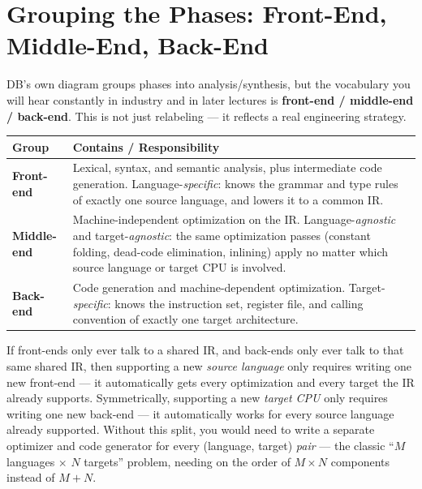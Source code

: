 \documentclass[full-course-notes.tex]{subfiles}
\begin{document}
\section{Grouping the Phases: Front-End, Middle-End, Back-End}
\label{sec:l2-grouping-phases}

\beyonddb DB's own diagram groups phases into analysis/synthesis, but the vocabulary you will
hear constantly in industry and in later lectures is \textbf{front-end / middle-end / back-end}.
This is not just relabeling --- it reflects a real engineering strategy.

\begin{center}
\renewcommand{\arraystretch}{1.3}
\begin{tabularx}{\textwidth}{@{}l X@{}}
\toprule
\textbf{Group} & \textbf{Contains / Responsibility} \\
\midrule
\textbf{Front-end} & Lexical, syntax, and semantic analysis, plus intermediate code
generation. Language-\emph{specific}: knows the grammar and type rules of exactly one source
language, and lowers it to a common IR. \\
\textbf{Middle-end} & Machine-independent optimization on the IR. Language-\emph{agnostic} and
target-\emph{agnostic}: the same optimization passes (constant folding, dead-code elimination,
inlining) apply no matter which source language or target CPU is involved. \\
\textbf{Back-end} & Code generation and machine-dependent optimization. Target-\emph{specific}:
knows the instruction set, register file, and calling convention of exactly one target
architecture. \\
\bottomrule
\end{tabularx}
\end{center}

\begin{coreidea}
If front-ends only ever talk to a shared IR, and back-ends only ever talk to that same shared
IR, then supporting a new \emph{source language} only requires writing one new front-end --- it
automatically gets every optimization and every target the IR already supports. Symmetrically,
supporting a new \emph{target CPU} only requires writing one new back-end --- it automatically
works for every source language already supported. Without this split, you would need to write a
separate optimizer and code generator for every (language, target) \emph{pair} --- the classic
``$M$ languages $\times$ $N$ targets'' problem, needing on the order of $M \times N$ components
instead of $M + N$.
\end{coreidea}
\end{document}
